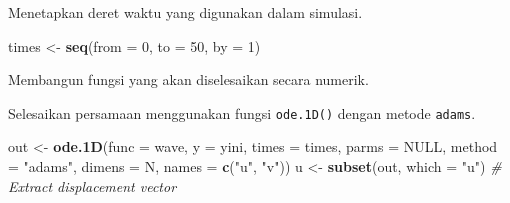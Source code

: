 \documentclass[
]{book}
\newenvironment{Shaded}{\begin{snugshade}}{\end{snugshade}}
\newcommand{\AttributeTok}[1]{\textcolor[rgb]{0.13,0.29,0.53}{#1}}
\newcommand{\CommentTok}[1]{\textcolor[rgb]{0.56,0.35,0.01}{\textit{#1}}}
\newcommand{\ConstantTok}[1]{\textcolor[rgb]{0.56,0.35,0.01}{#1}}
\newcommand{\ControlFlowTok}[1]{\textcolor[rgb]{0.13,0.29,0.53}{\textbf{#1}}}
\newcommand{\DecValTok}[1]{\textcolor[rgb]{0.00,0.00,0.81}{#1}}
\newcommand{\FunctionTok}[1]{\textcolor[rgb]{0.13,0.29,0.53}{\textbf{#1}}}
\newcommand{\NormalTok}[1]{#1}
\newcommand{\OtherTok}[1]{\textcolor[rgb]{0.56,0.35,0.01}{#1}}
\newcommand{\SpecialCharTok}[1]{\textcolor[rgb]{0.81,0.36,0.00}{\textbf{#1}}}
\newcommand{\StringTok}[1]{\textcolor[rgb]{0.31,0.60,0.02}{#1}}
\theoremstyle{definition}
\theoremstyle{definition}
\theoremstyle{definition}
\theoremstyle{definition}
\theoremstyle{remark}
\begin{document}
Menetapkan deret waktu yang digunakan dalam simulasi.

\begin{Shaded}
\begin{Highlighting}[]
\NormalTok{times }\OtherTok{\textless{}{-}} \FunctionTok{seq}\NormalTok{(}\AttributeTok{from =} \DecValTok{0}\NormalTok{, }\AttributeTok{to =} \DecValTok{50}\NormalTok{, }\AttributeTok{by =} \DecValTok{1}\NormalTok{)}
\end{Highlighting}
\end{Shaded}

Membangun fungsi yang akan diselesaikan secara numerik.

\begin{Shaded}
\end{Shaded}

Selesaikan persamaan menggunakan fungsi \texttt{ode.1D()} dengan metode \texttt{adams}.

\begin{Shaded}
\begin{Highlighting}[]
\NormalTok{out }\OtherTok{\textless{}{-}} \FunctionTok{ode.1D}\NormalTok{(}\AttributeTok{func =}\NormalTok{ wave, }\AttributeTok{y =}\NormalTok{ yini, }\AttributeTok{times =}\NormalTok{ times,}
             \AttributeTok{parms =} \ConstantTok{NULL}\NormalTok{, }\AttributeTok{method =} \StringTok{"adams"}\NormalTok{,}
             \AttributeTok{dimens =}\NormalTok{ N, }\AttributeTok{names =} \FunctionTok{c}\NormalTok{(}\StringTok{"u"}\NormalTok{, }\StringTok{"v"}\NormalTok{))}
\NormalTok{u }\OtherTok{\textless{}{-}} \FunctionTok{subset}\NormalTok{(out, }\AttributeTok{which =} \StringTok{"u"}\NormalTok{) }\CommentTok{\# Extract displacement vector}
\end{Highlighting}
\end{Shaded}
\end{document}
